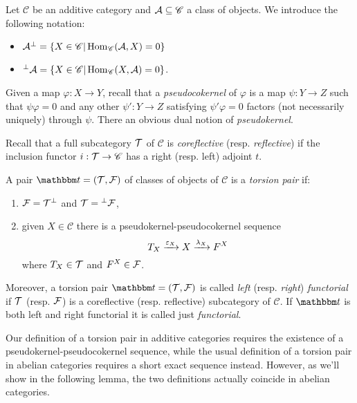 Let $\mathscr{C}$ be an additive category and $\mathcal{A}\subseteq \mathscr{C}$ a class of objects. We introduce the following notation:
\begin{itemize}
  \item $\mathcal{A}^\perp = \{X\in\mathscr{C}| \operatorname{Hom}_{\mathscr{C}}(\mathcal{A},X)=0\}$
  \item ${^\perp \mathcal{A}}=\{ X\in \mathscr{C}| \operatorname{Hom}_{\mathscr{C}}(X,\mathcal{A})=0\}$.
\end{itemize}

Given a map $\varphi:X\to Y$, recall that a \emph{pseudocokernel} of $\varphi$ is a map $\psi:Y\to Z$ such that $\psi\varphi=0$ and any other $\psi':Y\to Z$ satisfying $\psi'\varphi=0$ factors (not necessarily uniquely) through $\psi$. There an obvious dual notion of \emph{pseudokernel}.

Recall that a full subcategory $\mathcal{T}$ of $\mathscr{C}$ is \emph{coreflective} (resp. \emph{reflective}) if the inclusion functor $i:\mathcal{T}\to\mathscr{C}$ has a right (resp. left) adjoint $t$.
\begin{definition}\label{5:def:torsion_pair}
  A pair $\t=(\T,\F)$ of classes of objects of $\mathscr{C}$ is a \emph{torsion pair} if:
  \begin{enumerate}
    \item $\mathcal{F}=\mathcal{T}^\perp$ and $\mathcal{T} = {^\perp \mathcal{F}}$,
    \item given $X\in \mathscr{C}$ there is a pseudokernel-pseudocokernel sequence
      \begin{equation*}
        T_X\xrightarrow{\varepsilon_X} X\xrightarrow{\lambda_X} F^X
      \end{equation*}
      where $T_X\in\mathcal{T}$ and $F^X\in\mathcal{F}$.
  \end{enumerate}
  Moreover, a torsion pair $\t=(\T,\F)$ is called \emph{left} (resp. \emph{right}) \emph{functorial} if $\mathcal{T}$ (resp. $\mathcal{F}$) is a coreflective
  (resp. reflective) subcategory of $\mathscr{C}$. If $\t$ is both left and right functorial it is called just \emph{functorial}.
\end{definition}

\begin{rmk}
  Our definition of a torsion pair in additive categories requires the existence of a pseudokernel-pseudocokernel sequence, while the usual definition of a torsion pair in abelian categories requires a short exact sequence instead. However, as we'll show in the following lemma, the two definitions actually coincide in abelian categories.
\end{rmk}

